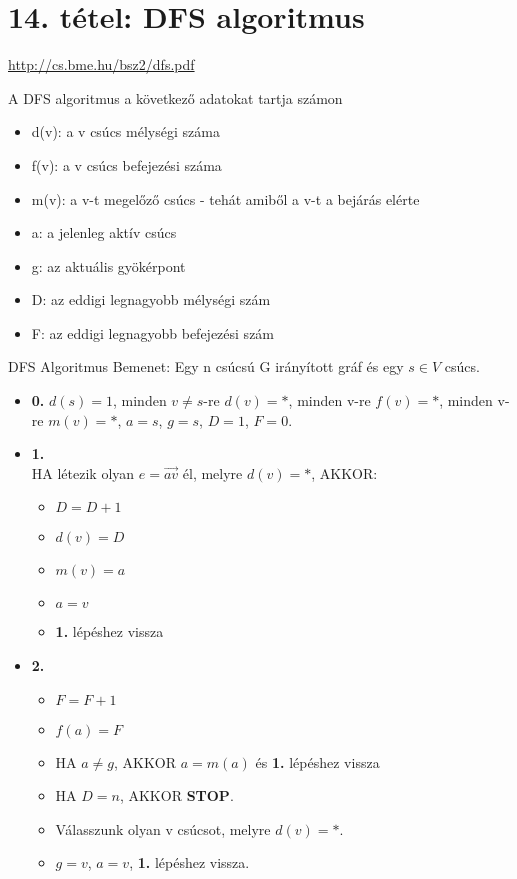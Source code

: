 \section{14. tétel: DFS algoritmus}

\url{http://cs.bme.hu/bsz2/dfs.pdf}

\begin{tetel}{A DFS algoritmus a következő adatokat tartja számon}
\begin{itemize}
\item d(v): a v csúcs mélységi száma
\item f(v): a v csúcs befejezési száma
\item m(v): a v-t megelőző csúcs - tehát amiből a v-t a bejárás elérte
\item a: a jelenleg aktív csúcs
\item g: az aktuális gyökérpont
\item D: az eddigi legnagyobb mélységi szám
\item F: az eddigi legnagyobb befejezési szám
\end{itemize}
\end{tetel}

\begin{tetel}{DFS Algoritmus}
Bemenet: Egy n csúcsú G irányított gráf és egy $s \in V$ csúcs.
\begin{itemize}
\item{\textbf{0.}} $d(s) = 1$, minden $v \neq s$-re $d(v) = *$, minden v-re $f(v) = *$, minden v-re $m(v) = *$, $a = s$, $g = s$, $D = 1$, $F = 0$.
\item{\textbf{1.}}
\\
HA létezik olyan $e = \overrightarrow{av}$ él, melyre $d(v) = *$, AKKOR:
	\begin{itemize}
	\item $D = D + 1$
	\item $d(v) = D$
	\item $m(v) = a$
	\item $a = v$
	\item \textbf{1.} lépéshez vissza
	\end{itemize}
\item{\textbf{2.}}
	\begin{itemize}
	\item $F = F + 1$
	\item $f(a) = F$
	\item HA $a \neq g$, AKKOR $a = m(a)$ és \textbf{1.} lépéshez vissza
	\item HA $D = n$, AKKOR \textbf{STOP}.
	\item Válasszunk olyan v csúcsot, melyre $d(v) = *$.
	\item $g = v$, $a = v$, \textbf{1.} lépéshez vissza.
	\end{itemize}
\end{itemize}
\end{tetel}

